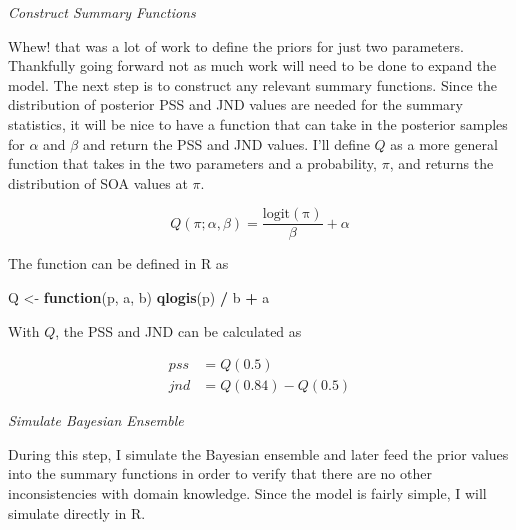 \documentclass[11pt, oneside, openany]{scrbook}
\newenvironment{Shaded}{\begin{snugshade}}{\end{snugshade}}
\newcommand{\ControlFlowTok}[1]{\textcolor[rgb]{0.13,0.29,0.53}{\textbf{#1}}}
\newcommand{\KeywordTok}[1]{\textcolor[rgb]{0.13,0.29,0.53}{\textbf{#1}}}
\newcommand{\NormalTok}[1]{#1}
\newcommand{\OperatorTok}[1]{\textcolor[rgb]{0.81,0.36,0.00}{\textbf{#1}}}
\newcommand{\StringTok}[1]{\textcolor[rgb]{0.31,0.60,0.02}{#1}}
\begin{document}
\emph{Construct Summary Functions}

Whew! that was a lot of work to define the priors for just two parameters. Thankfully going forward not as much work will need to be done to expand the model. The next step is to construct any relevant summary functions. Since the distribution of posterior PSS and JND values are needed for the summary statistics, it will be nice to have a function that can take in the posterior samples for \(\alpha\) and \(\beta\) and return the PSS and JND values. I'll define \(Q\) as a more general function that takes in the two parameters and a probability, \(\pi\), and returns the distribution of SOA values at \(\pi\).


\begin{equation}
  Q(\pi; \alpha, \beta) = \frac{\mathrm{logit(\pi)}}{\beta} + \alpha
  \label{eq:summfun1}
\end{equation}

The function can be defined in R as


\begin{Shaded}
\begin{Highlighting}[]
\NormalTok{Q <-}\StringTok{ }\ControlFlowTok{function}\NormalTok{(p, a, b) }\KeywordTok{qlogis}\NormalTok{(p) }\OperatorTok{/}\StringTok{ }\NormalTok{b }\OperatorTok{+}\StringTok{ }\NormalTok{a}
\end{Highlighting}
\end{Shaded}


With \(Q\), the PSS and JND can be calculated as


\begin{align}
  pss &= Q(0.5) \\
  jnd &= Q(0.84) - Q(0.5)
\end{align}

\emph{Simulate Bayesian Ensemble}

During this step, I simulate the Bayesian ensemble and later feed the prior values into the summary functions in order to verify that there are no other inconsistencies with domain knowledge. Since the model is fairly simple, I will simulate directly in R.

\end{document}
